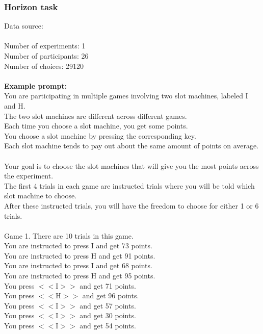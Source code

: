 \documentclass[pdflatex,sn-nature]{sn-jnl}%
\theoremstyle{thmstyleone}%
\theoremstyle{thmstyletwo}%
\theoremstyle{thmstylethree}%
\begin{document}
\subsubsection*{Horizon task}
Data source: \cite{feng2021dynamics} \\ $~$ \\
Number of experiments: 1 $~$\\ 
Number of participants: 26 $~$\\ 
Number of choices: 29120 $~$\\ 
 $~$\\ 
\textbf{Example prompt:}
 $~$\\ 
You are participating in multiple games involving two slot machines, labeled I and H. $~$\\ 
The two slot machines are different across different games. $~$\\ 
Each time you choose a slot machine, you get some points. $~$\\ 
You choose a slot machine by pressing the corresponding key. $~$\\ 
Each slot machine tends to pay out about the same amount of points on average. $~$\\ 
Your goal is to choose the slot machines that will give you the most points across the experiment. $~$\\ 
The first 4 trials in each game are instructed trials where you will be told which slot machine to choose. $~$\\ 
After these instructed trials, you will have the freedom to choose for either 1 or 6 trials. $~$\\ 
 $~$\\ 
Game 1. There are 10 trials in this game. $~$\\ 
You are instructed to press I and get 73 points. $~$\\ 
You are instructed to press H and get 91 points. $~$\\ 
You are instructed to press I and get 68 points. $~$\\ 
You are instructed to press H and get 95 points. $~$\\ 
You press $<<$I$>>$ and get 71 points. $~$\\ 
You press $<<$H$>>$ and get 96 points. $~$\\ 
You press $<<$I$>>$ and get 57 points. $~$\\ 
You press $<<$I$>>$ and get 30 points. $~$\\ 
You press $<<$I$>>$ and get 54 points. $~$\\ 
\end{document}
